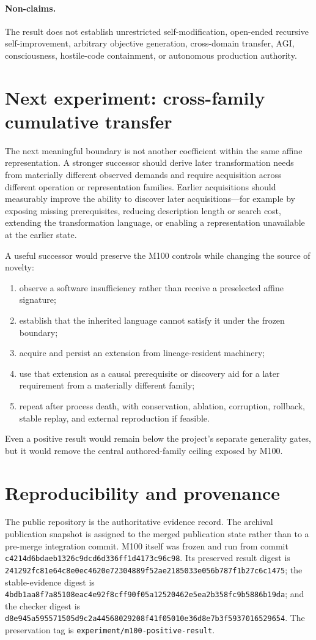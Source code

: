 \documentclass[10pt]{article}
\newcommand{\code}[1]{\texttt{#1}}
\begin{document}
\paragraph{Non-claims.} The result does not establish unrestricted self-modification, open-ended recursive self-improvement, arbitrary objective generation, cross-domain transfer, AGI, consciousness, hostile-code containment, or autonomous production authority.

\section{Next experiment: cross-family cumulative transfer}
The next meaningful boundary is not another coefficient within the same affine representation. A stronger successor should derive later transformation needs from materially different observed demands and require acquisition across different operation or representation families. Earlier acquisitions should measurably improve the ability to discover later acquisitions---for example by exposing missing prerequisites, reducing description length or search cost, extending the transformation language, or enabling a representation unavailable at the earlier state.

A useful successor would preserve the M100 controls while changing the source of novelty:
\begin{enumerate}
  \item observe a software insufficiency rather than receive a preselected affine signature;
  \item establish that the inherited language cannot satisfy it under the frozen boundary;
  \item acquire and persist an extension from lineage-resident machinery;
  \item use that extension as a causal prerequisite or discovery aid for a later requirement from a materially different family;
  \item repeat after process death, with conservation, ablation, corruption, rollback, stable replay, and external reproduction if feasible.
\end{enumerate}
Even a positive result would remain below the project's separate generality gates, but it would remove the central authored-family ceiling exposed by M100.

\section{Reproducibility and provenance}
\label{sec:repro}
The public repository is the authoritative evidence record. The archival publication snapshot is assigned to the merged publication state rather than to a pre-merge integration commit. M100 itself was frozen and run from commit \code{c4214d6bdaeb1326c9dcd6d336ff1d4173c96c98}. Its preserved result digest is \code{241292fc81e64c8e0ec4620e72304889f52ae2185033e056b787f1b27c6c1475}; the stable-evidence digest is \code{4bdb1aa8f7a85108eac4e92f8cff90f05a12520462e5ea2b358fc9b5886b19da}; and the checker digest is \code{d8e945a595571505d9c2a44568029208f41f05010e36d8e7b3f5937016529654}. The preservation tag is \code{experiment/m100-positive-result}.
\end{document}
